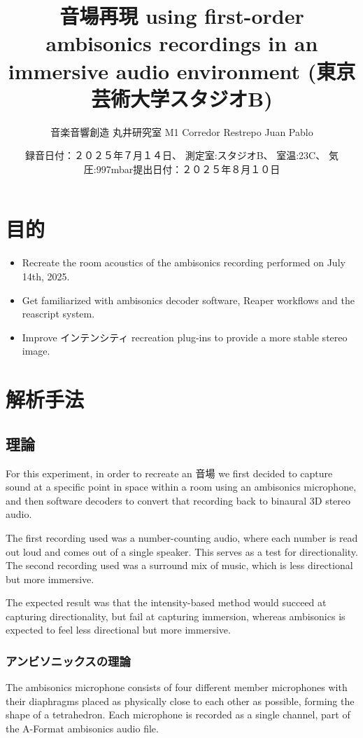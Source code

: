 \documentclass[a4paper, 12pt]{article}
\title{音場再現 using first-order ambisonics recordings in an immersive audio environment (東京芸術大学スタジオB)}
\author{音楽音響創造 丸井研究室 M1 Corredor Restrepo Juan Pablo}
\date{録音日付：２０２５年７月１４日、 測定室:スタジオB、 室温:23C、 気圧:997mbar}
\date{提出日付：２０２５年８月１０日}
\begin{document}
\maketitle

\section{目的}
\begin{itemize}
    \item Recreate the room acoustics of the ambisonics recording performed on July 14th, 2025.
    \item Get familiarized with ambisonics decoder software, Reaper workflows and the reascript system.
    \item Improve インテンシティ recreation plug-ins to provide a more stable stereo image.
\end{itemize} 

\section*{解析手法}

\subsection{理論}

For this experiment, in order to recreate an 音場 we first decided to capture sound at a specific point in space within a room using an ambisonics microphone, and then software decoders to convert that recording back to binaural 3D stereo audio.

The first recording used was a number-counting audio, where each number is read out loud and comes out of a single speaker. This serves as a test for directionality. The second recording used was a surround mix of music, which is less directional but more immersive.

The expected result was that the intensity-based method would succeed at capturing directionality, but fail at capturing immersion, whereas ambisonics is expected to feel less directional but more immersive.

\subsubsection{アンビソニックスの理論}

The ambisonics microphone consists of four different member microphones with their diaphragms placed as physically close to each other as possible, forming the shape of a tetrahedron. Each microphone is recorded as a single channel, part of the A-Format ambisonics audio file. \cite{nachbar2011ambix}
\end{document}
